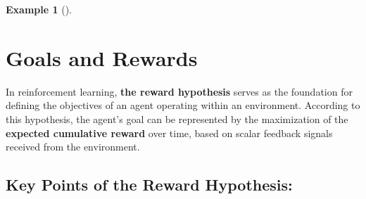 \documentclass[
  letterpaper,
]{krantz}
\theoremstyle{plain}
\theoremstyle{definition}
\newtheorem{example}{Example}[chapter]
\theoremstyle{definition}
\theoremstyle{remark}
\begin{document}
\begin{example}[]
\begin{figure}
\end{figure}%

\begin{figure}


\caption{\label{fig-robot-table}}

\end{figure}%

\section{Goals and Rewards}\label{goals-and-rewards}

In reinforcement learning, \textbf{the reward hypothesis} serves as the
foundation for defining the objectives of an agent operating within an
environment. According to this hypothesis, the agent's goal can be
represented by the maximization of the \textbf{expected cumulative
reward} over time, based on scalar feedback signals received from the
environment.

\subsection{Key Points of the Reward
Hypothesis:}\label{key-points-of-the-reward-hypothesis}


\end{example}
\end{document}
